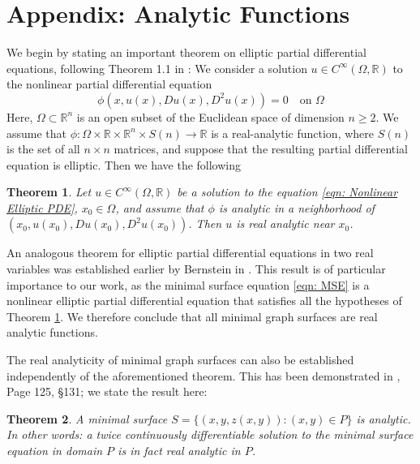 \documentclass[12pt]{article}
\theoremstyle{plain}
\newtheorem{theorem}{Theorem}[section]
\theoremstyle{definition}
\theoremstyle{remark}
\begin{document}
    \section{Appendix: Analytic Functions} \label{section: Appendix analytic function}  
   We begin by stating an important theorem on elliptic partial differential equations, following Theorem 1.1 in \cite{Bl}:  We consider a solution \(u \in C^\infty(\Omega, \mathbb{R})\) to the nonlinear partial differential equation
   \begin{equation}
   	\label{eqn: Nonlinear Elliptic PDE}
   	\phi(x, u(x), Du(x), D^2u(x)) = 0 \quad \text{on } \Omega
   \end{equation} 
   Here, \(\Omega \subset \mathbb{R}^n\) is an open subset of the Euclidean space of dimension \(n \ge 2\). We assume that \(\phi : \Omega \times \mathbb{R} \times \mathbb{R}^n \times S(n) \to \mathbb{R}\) is a real-analytic function, where \(S(n)\) is the set of all \(n\times n\) matrices, and suppose that the resulting partial differential equation is elliptic. Then we have the following
   \begin{theorem}
   	\label{thm: Nonlinear Elliptic PDE: analytic solns}
   	Let \(u \in C^\infty(\Omega, \mathbb{R})\) be a solution to the equation \ref{eqn: Nonlinear Elliptic PDE}, \(x_0 \in \Omega\), and assume that \(\phi\) is analytic in a neighborhood of \((x_0, u(x_0), Du(x_0), D^2u(x_0))\). Then \(u\) is real analytic near \(x_0\).
   \end{theorem}
   An analogous theorem for elliptic partial differential equations in two real variables was established earlier by Bernstein in \cite{Be}. This result is of particular importance to our work, as the minimal surface equation \ref{eqn: MSE} is a nonlinear elliptic partial differential equation that satisfies all the hypotheses of Theorem \ref{thm: Nonlinear Elliptic PDE: analytic solns}. We therefore conclude that all minimal graph surfaces are real analytic functions.
   
   The real analyticity of minimal graph surfaces can also be established independently of the aforementioned theorem. This has been demonstrated in \cite{Ni}, Page 125, \S 131; we state the result here:
   \begin{theorem}
   	\label{thm: MGS is real analytic}
   	A minimal surface \( S = \{ (x, y, z(x, y)) : (x, y) \in P \} \) is analytic. In other words: a twice continuously differentiable solution to the minimal surface equation in domain \( P \) is in fact real analytic in \( P \).
   \end{theorem}
   
\end{document}
